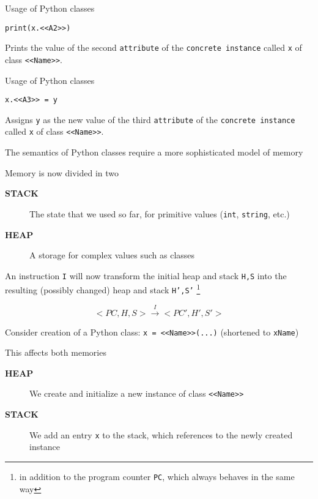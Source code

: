 \documentclass{beamer}
\begin{document}
\begin{frame}[fragile]{Usage of Python classes}
\begin{lstlisting}
print(x.<<A2>>)
\end{lstlisting}

Prints the value of the second \texttt{attribute} of the \texttt{concrete instance} called \texttt{x} of class \texttt{<<Name>>}.
\end{frame}

\begin{frame}[fragile]{Usage of Python classes}
\begin{lstlisting}
x.<<A3>> = y
\end{lstlisting}

Assigns \texttt{y} as the new value of the third \texttt{attribute} of the \texttt{concrete instance} called \texttt{x} of class \texttt{<<Name>>}.
\end{frame}

\begin{slide}{
\item The semantics of Python classes require a more sophisticated model of memory
\item Memory is now divided in two
\begin{description}
\item[\textbf{STACK}] The state that we used so far, for primitive values (\texttt{int}, \texttt{string}, etc.)
\item[\textbf{HEAP}] A storage for complex values such as classes
\end{description}
}\end{slide}

\begin{slide}{
\item An instruction \texttt{I} will now transform the initial heap and stack \texttt{H,S} into the resulting (possibly changed) heap and stack \texttt{H',S'} \footnote{in addition to the program counter \texttt{PC}, which always behaves in the same way}

$$<PC,H,S> \overset{I}{\rightarrow} <PC',H',S'>$$
}\end{slide}

\begin{slide}{
\item Consider creation of a Python class: \texttt{x = <<Name>>(...)} (shortened to \texttt{xName})
\item This affects both memories
\begin{description}
\item[\textbf{HEAP}] We create and initialize a new instance of class \texttt{<<Name>>}
\item[\textbf{STACK}] We add an entry \texttt{x} to the stack, which references to the newly created instance
\end{description}
}\end{slide}
\end{document}
